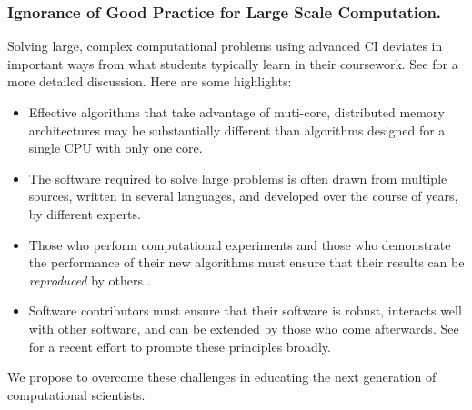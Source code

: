 \documentclass[11pt]{NSFamsart}
\begin{document}
\subsubsection*{Ignorance of Good Practice for Large Scale Computation.}  Solving large, complex computational problems using advanced CI deviates in important ways from what students typically learn in their coursework. See \cite[Sect.\ 2.4]{RudEtal18a} for a more detailed discussion.  Here are some highlights:

\begin{itemize}

\item Effective algorithms that take advantage of muti-core, distributed memory architectures may be substantially different than algorithms designed for a single CPU with only one core.

\item The software required to solve large problems is often drawn from multiple sources, written in several languages, and developed over the course of years, by different experts.

\item Those who perform computational experiments and those who demonstrate the performance of their new algorithms must ensure that their results can be \emph{reproduced} by others \cite{Pen11}.  

\item Software contributors must ensure that their software is robust, interacts well with other software, and can be extended by those who come afterwards.  See \cite{BSS18} for a recent effort to promote these principles broadly.

\end{itemize}

We propose to overcome these challenges in educating the next generation of computational scientists.
\end{document}
